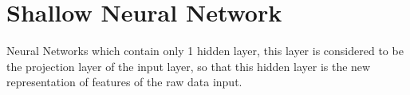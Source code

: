 \section{Shallow Neural Network}
Neural Networks which contain only 1 hidden layer, this layer is considered to be the projection layer of the input layer, so that this hidden layer is the new representation of features of the raw data input.